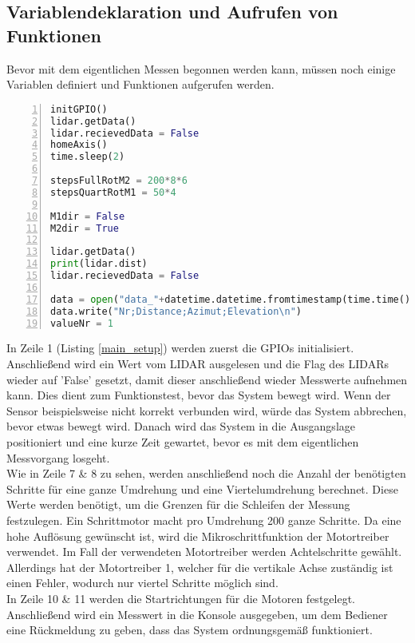 \subsection{Variablendeklaration und Aufrufen von Funktionen}
Bevor mit dem eigentlichen Messen begonnen werden kann, müssen noch einige Variablen definiert und Funktionen aufgerufen werden.
\begin{lstlisting}[caption={Aufrufen von Funktionen und Variablen deklaration}, language={Python}, label={main_setup}, numbers=left]
initGPIO()
lidar.getData()
lidar.recievedData = False
homeAxis()
time.sleep(2)

stepsFullRotM2 = 200*8*6
stepsQuartRotM1 = 50*4

M1dir = False
M2dir = True

lidar.getData()
print(lidar.dist)
lidar.recievedData = False

data = open("data_"+datetime.datetime.fromtimestamp(time.time()).strftime('%Y-%m-%d_%H-%M-%S')+".csv", "w")
data.write("Nr;Distance;Azimut;Elevation\n")
valueNr = 1
\end{lstlisting}
In Zeile 1 (Listing \ref{main_setup}) werden zuerst die \acp{GPIO} initialisiert. Anschließend wird ein Wert vom \ac{LIDAR} ausgelesen  und die Flag des \acp{LIDAR} wieder auf 'False' gesetzt, damit dieser anschließend wieder Messwerte aufnehmen kann. Dies dient zum Funktionstest, bevor das System bewegt wird. Wenn der Sensor beispielsweise nicht korrekt verbunden wird, würde das System abbrechen, bevor etwas bewegt wird. Danach wird das System in die Ausgangslage positioniert und eine kurze Zeit gewartet, bevor es mit dem eigentlichen Messvorgang losgeht.\\
Wie in Zeile 7 \& 8 zu sehen, werden anschließend noch die Anzahl der benötigten Schritte für eine ganze Umdrehung und eine Viertelumdrehung berechnet. Diese Werte werden benötigt, um die Grenzen für die Schleifen der Messung festzulegen. Ein Schrittmotor macht pro Umdrehung 200 ganze Schritte. Da eine hohe Auflösung gewünscht ist, wird die Mikroschrittfunktion der Motortreiber verwendet. Im Fall der verwendeten Motortreiber werden Achtelschritte gewählt. Allerdings hat der Motortreiber 1, welcher für die vertikale Achse zuständig ist einen Fehler, wodurch nur viertel Schritte möglich sind.\\
In Zeile 10 \& 11 werden die Startrichtungen für die Motoren festgelegt.\\
Anschließend wird ein Messwert in die Konsole ausgegeben, um dem Bediener eine Rückmeldung zu geben, dass das System ordnungsgemäß funktioniert.\\
